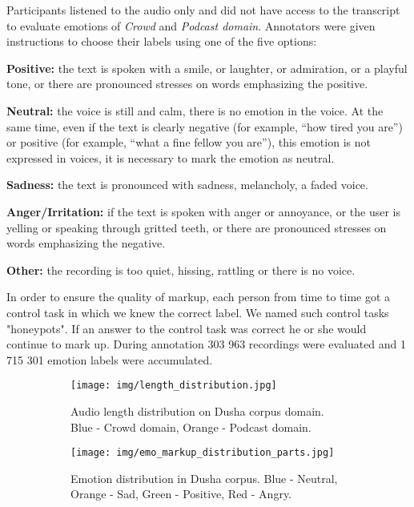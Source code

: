 \documentclass{article}
\begin{document}
Participants listened to the audio only and did not have access to the transcript to evaluate emotions of \textit{Crowd} and \textit{Podcast domain}. Annotators were given instructions to choose their labels using one of the five options:

\textbf{Positive:} the text is spoken with a smile, or laughter, or admiration, or a playful tone, or there are pronounced stresses on words emphasizing the positive.

\textbf{Neutral:} the voice is still and calm, there is no emotion in the voice. At the same time, even if the text is clearly negative (for example, “how tired you are”) or positive (for example, “what a fine fellow you are”), this emotion is not expressed in voices, it is necessary to mark the emotion as neutral.

\textbf{Sadness:} the text is pronounced with sadness, melancholy, a faded voice.

\textbf{Anger/Irritation:} if the text is spoken with anger or annoyance, or the user is yelling or speaking through gritted teeth, or there are pronounced stresses on words emphasizing the negative.

\textbf{Other:} the recording is too quiet, hissing, rattling or there is no voice.

In order to ensure the quality of markup, each person from time to time got a control task in which we knew the correct label. We named such control tasks "honeypots". If an answer to the control task was correct he or she would continue to mark up. During annotation 303 963 recordings were evaluated and 1 715 301 emotion labels were accumulated. 

\begin{figure}[t]
  \centering
  \begin{subfigure}[b]{0.45\linewidth}
    \centering
    \texttt{[image: img/length\_distribution.jpg]}
    \caption{Audio length distribution on Dusha corpus domain. Blue - Crowd domain, Orange - Podcast domain.}
  \end{subfigure}
\hfill
  \begin{subfigure}[b]{0.45\linewidth}
    \centering
    \texttt{[image: img/emo\_markup\_distribution\_parts.jpg]}
    \caption{Emotion distribution in Dusha corpus. Blue - Neutral, Orange - Sad, Green - Positive, Red - Angry.}
  \end{subfigure}
   \caption{}
  \label{fig:len_and_emotion_distrib}
\end{figure}
\end{document}
